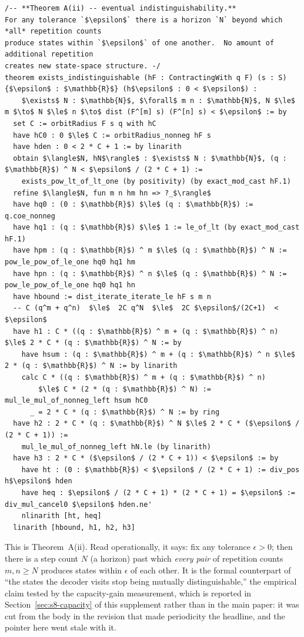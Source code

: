 \documentclass[11pt]{article}
\begin{document}
\begin{lstlisting}
/-- **Theorem A(ii) -- eventual indistinguishability.**
For any tolerance `$\epsilon$` there is a horizon `N` beyond which *all* repetition counts
produce states within `$\epsilon$` of one another.  No amount of additional repetition
creates new state-space structure. -/
theorem exists_indistinguishable (hF : ContractingWith q F) (s : S) {$\epsilon$ : $\mathbb{R}$} (h$\epsilon$ : 0 < $\epsilon$) :
    $\exists$ N : $\mathbb{N}$, $\forall$ m n : $\mathbb{N}$, N $\le$ m $\to$ N $\le$ n $\to$ dist (F^[m] s) (F^[n] s) < $\epsilon$ := by
  set C := orbitRadius F s q with hC
  have hC0 : 0 $\le$ C := orbitRadius_nonneg hF s
  have hden : 0 < 2 * C + 1 := by linarith
  obtain $\langle$N, hN$\rangle$ : $\exists$ N : $\mathbb{N}$, (q : $\mathbb{R}$) ^ N < $\epsilon$ / (2 * C + 1) :=
    exists_pow_lt_of_lt_one (by positivity) (by exact_mod_cast hF.1)
  refine $\langle$N, fun m n hm hn => ?_$\rangle$
  have hq0 : (0 : $\mathbb{R}$) $\le$ (q : $\mathbb{R}$) := q.coe_nonneg
  have hq1 : (q : $\mathbb{R}$) $\le$ 1 := le_of_lt (by exact_mod_cast hF.1)
  have hpm : (q : $\mathbb{R}$) ^ m $\le$ (q : $\mathbb{R}$) ^ N := pow_le_pow_of_le_one hq0 hq1 hm
  have hpn : (q : $\mathbb{R}$) ^ n $\le$ (q : $\mathbb{R}$) ^ N := pow_le_pow_of_le_one hq0 hq1 hn
  have hbound := dist_iterate_iterate_le hF s m n
  -- C (q^m + q^n)  $\le$  2C q^N  $\le$  2C $\epsilon$/(2C+1)  <  $\epsilon$
  have h1 : C * ((q : $\mathbb{R}$) ^ m + (q : $\mathbb{R}$) ^ n) $\le$ 2 * C * (q : $\mathbb{R}$) ^ N := by
    have hsum : (q : $\mathbb{R}$) ^ m + (q : $\mathbb{R}$) ^ n $\le$ 2 * (q : $\mathbb{R}$) ^ N := by linarith
    calc C * ((q : $\mathbb{R}$) ^ m + (q : $\mathbb{R}$) ^ n)
        $\le$ C * (2 * (q : $\mathbb{R}$) ^ N) := mul_le_mul_of_nonneg_left hsum hC0
      _ = 2 * C * (q : $\mathbb{R}$) ^ N := by ring
  have h2 : 2 * C * (q : $\mathbb{R}$) ^ N $\le$ 2 * C * ($\epsilon$ / (2 * C + 1)) :=
    mul_le_mul_of_nonneg_left hN.le (by linarith)
  have h3 : 2 * C * ($\epsilon$ / (2 * C + 1)) < $\epsilon$ := by
    have ht : (0 : $\mathbb{R}$) < $\epsilon$ / (2 * C + 1) := div_pos h$\epsilon$ hden
    have heq : $\epsilon$ / (2 * C + 1) * (2 * C + 1) = $\epsilon$ := div_mul_cancel0 $\epsilon$ hden.ne'
    nlinarith [ht, heq]
  linarith [hbound, h1, h2, h3]
\end{lstlisting}

This is Theorem~A(ii). Read operationally, it says: fix any tolerance
$\epsilon>0$; then there is a step count $N$ (a horizon) past which \emph{every
pair} of repetition counts $m,n \ge N$ produces states within $\epsilon$ of
each other. It is the formal counterpart of ``the states the decoder visits
stop being mutually distinguishable,'' the empirical claim tested by the
capacity-gain measurement, which is reported in
Section~\ref{sec:s8-capacity} of this supplement rather than in the main paper:
it was cut from the body in the revision that made periodicity the headline, and
the pointer here went stale with it.
\end{document}
